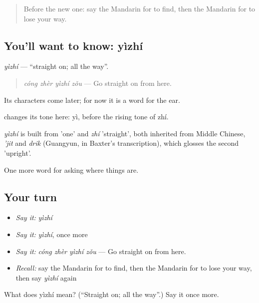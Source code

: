 \begin{quote}
Before the new one: say the Mandarin for to find, then the Mandarin for to lose your way.
\end{quote}

\subsection*{You'll want to know: yìzhí}
\emph{yìzhí} — \textquotedblleft{}straight on; all the way\textquotedblright{}.

\begin{quote}
\emph{cóng zhèr yìzhí zǒu} — Go straight on from here.
\end{quote}

Its characters come later; for now it is a word for the ear.

 changes its tone here: yì, before the rising tone of zhí.

\begin{cousinweb}
\emph{yìzhí} is built from  'one' and \emph{zhí} 'straight', both inherited from Middle Chinese, \emph{'jit} and \emph{drik} (Guangyun, in Baxter's transcription), which glosses the second 'upright'.
\end{cousinweb}

\begin{grammarlens}[title={What you've built}]
One more word for asking where things are.
\end{grammarlens}

\subsection*{Your turn}
\begin{itemize}
\raggedright
  \item \emph{Say it:} \emph{yìzhí}
  \item \emph{Say it:} \emph{yìzhí}, once more
  \item \emph{Say it:} \emph{cóng zhèr yìzhí zǒu} — Go straight on from here.
  \item \emph{Recall:} say the Mandarin for to find, then the Mandarin for to lose your way, then say \emph{yìzhí} again
\end{itemize}

\begin{tcolorbox}[breakable,colback=teal!4,colframe=teal!35!black,title={Before you move on}]
What does yìzhí mean? (\textquotedblleft{}Straight on; all the way\textquotedblright{}.) Say it once more.
\end{tcolorbox}
